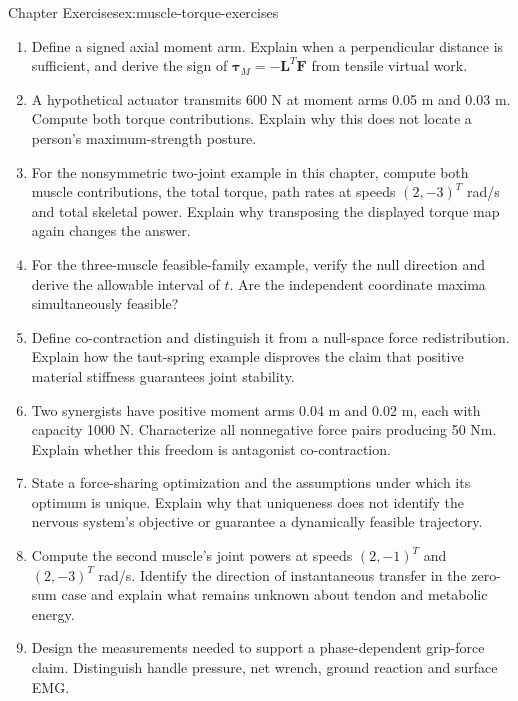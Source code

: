 \begin{exercises}{Chapter Exercises}{ex:muscle-torque-exercises}
\begin{enumerate}
\item Define a signed axial moment arm. Explain when a perpendicular distance is sufficient, and derive the sign of $\bm\tau_M=-\bm L^T\bm F$ from tensile virtual work.

\item A hypothetical actuator transmits 600 N at moment arms 0.05 m and 0.03 m. Compute both torque contributions. Explain why this does not locate a person's maximum-strength posture.

\item For the nonsymmetric two-joint example in this chapter, compute both muscle contributions, the total torque, path rates at speeds $(2,-3)^T$ rad/s and total skeletal power. Explain why transposing the displayed torque map again changes the answer.

\tcbbreak
\item For the three-muscle feasible-family example, verify the null direction and derive the allowable interval of $t$. Are the independent coordinate maxima simultaneously feasible?

\item Define co-contraction and distinguish it from a null-space force redistribution. Explain how the taut-spring example disproves the claim that positive material stiffness guarantees joint stability.

\item Two synergists have positive moment arms 0.04 m and 0.02 m, each with capacity 1000 N. Characterize all nonnegative force pairs producing 50 Nm. Explain whether this freedom is antagonist co-contraction.

\item State a force-sharing optimization and the assumptions under which its optimum is unique. Explain why that uniqueness does not identify the nervous system's objective or guarantee a dynamically feasible trajectory.

\item Compute the second muscle's joint powers at speeds $(2,-1)^T$ and $(2,-3)^T$ rad/s. Identify the direction of instantaneous transfer in the zero-sum case and explain what remains unknown about tendon and metabolic energy.

\item Design the measurements needed to support a phase-dependent grip-force claim. Distinguish handle pressure, net wrench, ground reaction and surface EMG.


\end{enumerate}
\end{exercises}
